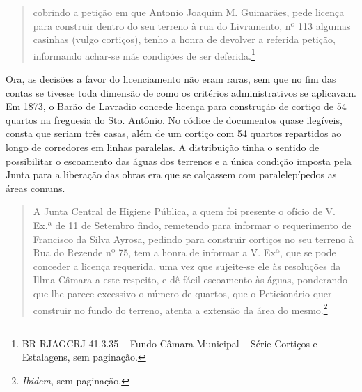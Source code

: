 \begin{quote}
cobrindo a petição em que Antonio Joaquim M. Guimarães, pede licença
para construir dentro do seu terreno à rua do Livramento, nº 113 algumas
casinhas (vulgo cortiços), tenho a honra de devolver a referida petição,
informando achar-se más condições de ser deferida.\footnote{BR RJAGCRJ
  41.3.35 -- Fundo Câmara Municipal -- Série Cortiços e Estalagens, sem
  paginação.}
\end{quote}

Ora, as decisões a favor do licenciamento não eram raras, sem que no fim
das contas se tivesse toda dimensão de como os critérios administrativos
se aplicavam. Em 1873, o Barão de Lavradio concede licença para
construção de cortiço de 54 quartos na freguesia do Sto. Antônio. No
códice de documentos quase ilegíveis, consta que seriam três casas, além
de um cortiço com 54 quartos repartidos ao longo de corredores em linhas
paralelas. A distribuição tinha o sentido de possibilitar o escoamento
das águas dos terrenos e a única condição imposta pela Junta para a
liberação das obras era que se calçassem com paralelepípedos as áreas
comuns.

\begin{quote}
A Junta Central de Higiene Pública, a quem foi presente o ofício de V.
Ex.ª de 11 de Setembro findo, remetendo para informar o requerimento de
Francisco da Silva Ayrosa, pedindo para construir cortiços no seu
terreno à Rua do Rezende nº 75, tem a honra de informar a V. Exª, que se
pode conceder a licença requerida, uma vez que sujeite-se ele às
resoluções da Illma Câmara a este respeito, e dê fácil escoamento às
águas, ponderando que lhe parece excessivo o número de quartos, que o
Peticionário quer construir no fundo do terreno, atenta a extensão da
área do mesmo.\footnote{\emph{Ibidem}, sem paginação.}
\end{quote}

